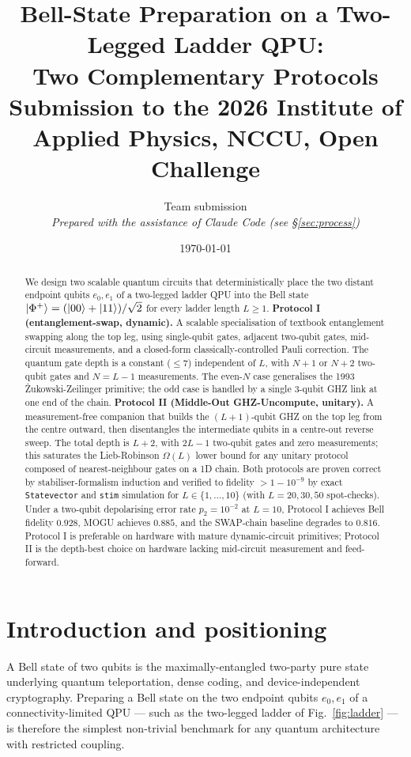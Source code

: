 \documentclass[11pt,a4paper]{article}
\title{\textbf{Bell-State Preparation on a Two-Legged Ladder QPU:\\
  Two Complementary Protocols}\\[6pt]
  \large Submission to the 2026 Institute of Applied Physics, NCCU, Open Challenge}
\author{Team submission\\
  \textit{Prepared with the assistance of Claude Code (see \S\ref{sec:process})}}
\date{\today}
\theoremstyle{definition}
\newcommand{\Phip}{\ket{\Phi^+}}
\begin{document}
\maketitle

\begin{abstract}
We design two scalable quantum circuits that deterministically place the
two distant endpoint qubits $e_0,e_1$ of a two-legged ladder QPU into the
Bell state $\Phip = (\ket{00}+\ket{11})/\sqrt 2$ for every ladder length
$L\ge 1$. \textbf{Protocol I (entanglement-swap, dynamic).} A scalable
specialisation of textbook entanglement swapping along the top leg, using
single-qubit gates, adjacent two-qubit gates, mid-circuit measurements,
and a closed-form classically-controlled Pauli correction. The quantum
gate depth is a constant ($\le 7$) independent of $L$, with $N+1$ or
$N+2$ two-qubit gates and $N=L-1$ measurements. The even-$N$ case
generalises the 1993 Żukowski-Zeilinger primitive; the odd case is
handled by a single 3-qubit GHZ link at one end of the chain.
\textbf{Protocol II (Middle-Out GHZ-Uncompute, unitary).} A
measurement-free companion that builds the $(L+1)$-qubit GHZ on the top
leg from the centre outward, then disentangles the intermediate qubits
in a centre-out reverse sweep. The total depth is $L+2$, with $2L-1$
two-qubit gates and zero measurements; this saturates the Lieb-Robinson
$\Omega(L)$ lower bound for any unitary protocol composed of
nearest-neighbour gates on a 1D chain. Both protocols are proven correct
by stabiliser-formalism induction and verified to fidelity $>1-10^{-9}$
by exact \texttt{Statevector} and \texttt{stim} simulation for
$L\in\{1,\dots,10\}$ (with $L=20,30,50$ spot-checks). Under a
two-qubit depolarising error rate $p_2=10^{-2}$ at $L=10$, Protocol I
achieves Bell fidelity $0.928$, MOGU achieves $0.885$, and the
SWAP-chain baseline degrades to $0.816$. Protocol I is preferable on
hardware with mature dynamic-circuit primitives; Protocol II is the
depth-best choice on hardware lacking mid-circuit measurement and
feed-forward.
\end{abstract}

\section{Introduction and positioning}
\label{sec:intro}

A Bell state of two qubits is the maximally-entangled two-party pure
state underlying quantum teleportation, dense coding, and
device-independent cryptography. Preparing a Bell state on the two
endpoint qubits $e_0,e_1$ of a connectivity-limited QPU — such as the
two-legged ladder of Fig.~\ref{fig:ladder} — is therefore the simplest
non-trivial benchmark for any quantum architecture with restricted
coupling.
\end{document}
